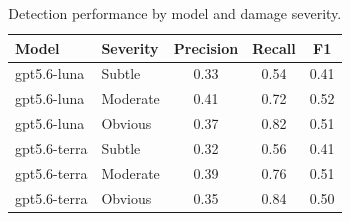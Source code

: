 \begin{table}[h]
\centering
\begin{tabular}{llccc}
\toprule
Model & Severity & Precision & Recall & F1 \\
\midrule
gpt5.6-luna & Subtle & 0.33 & 0.54 & 0.41 \\
gpt5.6-luna & Moderate & 0.41 & 0.72 & 0.52 \\
gpt5.6-luna & Obvious & 0.37 & 0.82 & 0.51 \\
\midrule
gpt5.6-terra & Subtle & 0.32 & 0.56 & 0.41 \\
gpt5.6-terra & Moderate & 0.39 & 0.76 & 0.51 \\
gpt5.6-terra & Obvious & 0.35 & 0.84 & 0.50 \\
\bottomrule
\end{tabular}
\caption{Detection performance by model and damage severity.}
\label{tab:model-severity}
\end{table}